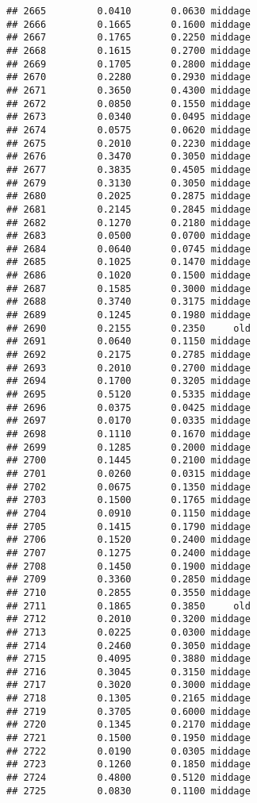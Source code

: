 \documentclass[
]{article}
\begin{document}
\begin{verbatim}
## 2665         0.0410       0.0630 middage
## 2666         0.1665       0.1600 middage
## 2667         0.1765       0.2250 middage
## 2668         0.1615       0.2700 middage
## 2669         0.1705       0.2800 middage
## 2670         0.2280       0.2930 middage
## 2671         0.3650       0.4300 middage
## 2672         0.0850       0.1550 middage
## 2673         0.0340       0.0495 middage
## 2674         0.0575       0.0620 middage
## 2675         0.2010       0.2230 middage
## 2676         0.3470       0.3050 middage
## 2677         0.3835       0.4505 middage
## 2679         0.3130       0.3050 middage
## 2680         0.2025       0.2875 middage
## 2681         0.2145       0.2845 middage
## 2682         0.1270       0.2180 middage
## 2683         0.0500       0.0700 middage
## 2684         0.0640       0.0745 middage
## 2685         0.1025       0.1470 middage
## 2686         0.1020       0.1500 middage
## 2687         0.1585       0.3000 middage
## 2688         0.3740       0.3175 middage
## 2689         0.1245       0.1980 middage
## 2690         0.2155       0.2350     old
## 2691         0.0640       0.1150 middage
## 2692         0.2175       0.2785 middage
## 2693         0.2010       0.2700 middage
## 2694         0.1700       0.3205 middage
## 2695         0.5120       0.5335 middage
## 2696         0.0375       0.0425 middage
## 2697         0.0170       0.0335 middage
## 2698         0.1110       0.1670 middage
## 2699         0.1285       0.2000 middage
## 2700         0.1445       0.2100 middage
## 2701         0.0260       0.0315 middage
## 2702         0.0675       0.1350 middage
## 2703         0.1500       0.1765 middage
## 2704         0.0910       0.1150 middage
## 2705         0.1415       0.1790 middage
## 2706         0.1520       0.2400 middage
## 2707         0.1275       0.2400 middage
## 2708         0.1450       0.1900 middage
## 2709         0.3360       0.2850 middage
## 2710         0.2855       0.3550 middage
## 2711         0.1865       0.3850     old
## 2712         0.2010       0.3200 middage
## 2713         0.0225       0.0300 middage
## 2714         0.2460       0.3050 middage
## 2715         0.4095       0.3880 middage
## 2716         0.3045       0.3150 middage
## 2717         0.3020       0.3000 middage
## 2718         0.1305       0.2165 middage
## 2719         0.3705       0.6000 middage
## 2720         0.1345       0.2170 middage
## 2721         0.1500       0.1950 middage
## 2722         0.0190       0.0305 middage
## 2723         0.1260       0.1850 middage
## 2724         0.4800       0.5120 middage
## 2725         0.0830       0.1100 middage

\end{verbatim}
\end{document}
